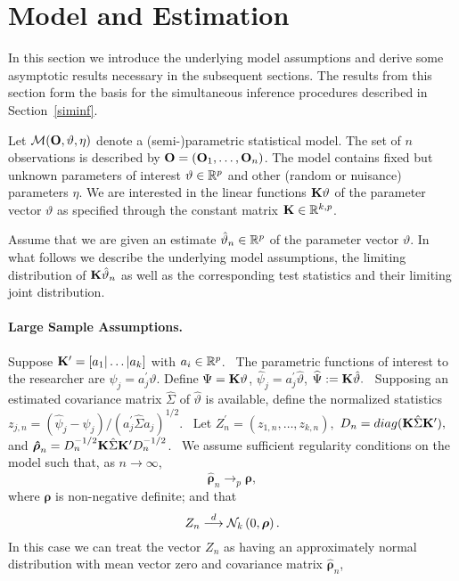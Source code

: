 \documentclass[12pt]{article}
\begin{document}
\section{Model and Estimation}

\label{model}

In this section we introduce the underlying model assumptions and derive
some asymptotic results necessary in the subsequent sections. The results
from this section form the basis for the simultaneous inference procedures
described in Section~\ref{siminf}.

Let $\mathcal{M}(\mathbf{O}, \vartheta, \eta)$ denote a (semi-)parametric statistical
model. The set of $n$ observations is described by $\Obs = (\Obs_1, \dots,
\Obs%
_n)$. The model contains fixed but unknown parameters of interest $\vartheta
\in \mathbb{R}^p$ and other (random or nuisance) parameters $\eta$. We are
interested in the linear functions $\mathbf{K} \vartheta$ of the parameter vector $%
\vartheta$ as specified through the constant matrix $\mathbf{K} \in \mathbb{R}^{k, p}$.

Assume that we are given an estimate $\hat{\vartheta}_n \in \mathbb{R}^p$ of the
parameter vector $\vartheta$. In what follows we describe the underlying
model assumptions, the limiting distribution of $\mathbf{K}\hat{\vartheta}_n$ as well
as the corresponding test statistics and their limiting joint distribution.

\paragraph{Large Sample Assumptions.}

Suppose $\mathbf{K}^{\prime }=[a_{1}|\ldots |a_{k}]$ with $a_{i}\in \mathbb{R}^{p}$. \ The
parametric functions of interest to the researcher are $\psi
_{j}=a_{j}^{\prime }\vartheta $. Define $\Psi =\mathbf{K}\vartheta $,  $\hat{\psi}%
_{j}=a_{j}^{\prime }\hat{\vartheta}$,  $\widehat{\Psi
}:=\mathbf{K}\hat{\vartheta}.$%
\ Supposing an estimated covariance matrix  $\hat{\Sigma}$ of
$\hat{\vartheta%
}$ is available, define the normalized statistics $z_{j,n}=(\hat{\psi}%
_{j}-\psi _{j})/(a_{j}^{\prime }\hat{\Sigma}a_{j})^{1/2}$. \ Let $%
Z_{n}^{\prime }=(z_{1,n},\ldots ,z_{k,n}),$ $D_{n}=diag(\K\hat{\Sigma}\K%
^{\prime }),$ and $\boldsymbol{\hat{\rho}}_{n}=D_{n}^{-1/2}\K\hat{\Sigma}\K%
^{\prime }D_{n}^{-1/2}$. \ We assume sufficient regularity conditions on the
model such that, as $n\rightarrow \infty $,%
\[
\boldsymbol{\hat{\rho}}_{n}\rightarrow _{p}\boldsymbol{\rho },
\]%
where $\boldsymbol{\rho }$ is non-negative definite; and that
\[
Z_{n}\stackrel{d}{\longrightarrow}\mathcal{N}_{k}\left( 0,\boldsymbol{\rho }\right) .
\]%
In this case we can treat the vector $Z_{n}$ as having an approximately
normal distribution with mean vector zero and covariance matrix  $%
\boldsymbol{\hat{\rho}}_{n}$,
\end{document}
